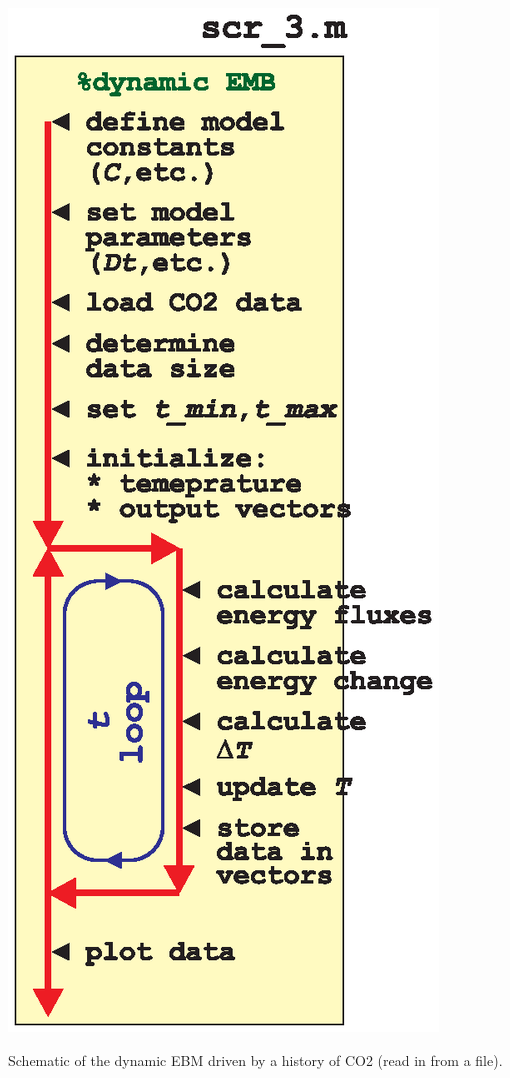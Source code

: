 \documentclass{tufte-book} %
\begin{document}
\begin{marginfigure}[0.0in]
\includegraphics[width=\linewidth]{ch9-schematic-scr3.eps}
\caption{Schematic of the dynamic EBM driven by a history of CO2 (read in from a file).}
\label{fig:ch9-schematic-scr3}
\end{marginfigure}
\end{document}
